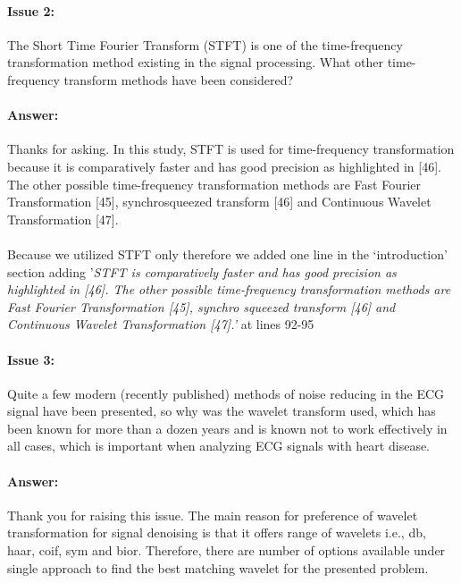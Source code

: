 \documentclass{article}
\begin{document}
\paragraph{Issue 2:}
\begin{displayquote}
 The Short Time Fourier Transform (STFT) is one of the time-frequency transformation method existing in the signal processing. What other time-frequency transform methods have been considered?
\end{displayquote}

\paragraph{Answer:}
Thanks for asking. In this study, STFT is used for time-frequency transformation because it is comparatively faster and has good precision as highlighted in [46]. The other possible time-frequency transformation methods are Fast Fourier Transformation [45], synchrosqueezed transform [46] and  Continuous Wavelet Transformation [47]. \\\\
‌
Because we utilized STFT only therefore we added one line in the `introduction' section adding '\textit{STFT is comparatively faster and has good precision as highlighted in [46]. The other possible time-frequency transformation methods are Fast Fourier Transformation [45], synchro squeezed transform [46] and Continuous Wavelet Transformation [47].'} at lines 92-95

\paragraph{Issue 3:}
\begin{displayquote}
Quite a few modern (recently published) methods of noise reducing in the ECG signal have been presented, so why was the wavelet transform used, which has been known for more than a dozen years and is known not to work effectively in all cases, which is important when analyzing ECG signals with heart disease.
\end{displayquote}

\paragraph{Answer:}
Thank you for raising this issue. The main reason for preference of wavelet transformation for signal denoising is that it offers range of wavelets i.e., db, haar, coif, sym and bior. Therefore, there are number of options available under single approach to find the best matching wavelet for the presented problem. \\\\
\end{document}
